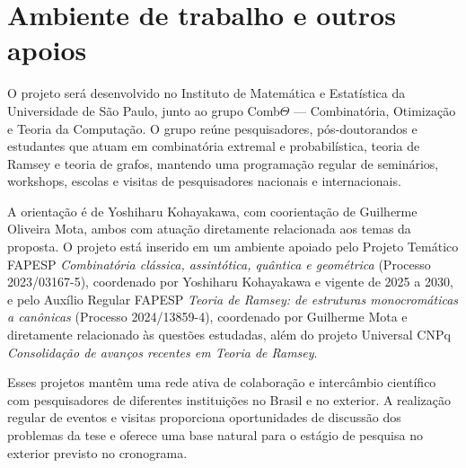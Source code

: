 \documentclass[11pt,a4paper]{article}
\theoremstyle{plain}
\theoremstyle{definition}
\begin{document}
\section{Ambiente de trabalho e outros apoios}


O projeto será desenvolvido no Instituto de Matemática e Estatística da
Universidade de São Paulo, junto ao grupo Comb$\Theta$ --- Combinatória,
Otimização e Teoria da Computação. O grupo reúne pesquisadores, pós-doutorandos
e estudantes que atuam em combinatória extremal e probabilística, teoria de
Ramsey e teoria de grafos, mantendo uma programação regular de seminários,
workshops, escolas e visitas de pesquisadores nacionais e internacionais.

A orientação é de Yoshiharu Kohayakawa, com coorientação de Guilherme Oliveira
Mota, ambos com atuação diretamente relacionada aos temas da proposta. O
projeto está inserido em um ambiente apoiado pelo Projeto Temático FAPESP
\emph{Combinatória clássica, assintótica, quântica e geométrica}
(Processo 2023/03167-5), coordenado por Yoshiharu Kohayakawa e vigente de
2025 a 2030, e pelo Auxílio Regular FAPESP
\emph{Teoria de Ramsey: de estruturas monocromáticas a canônicas}
(Processo 2024/13859-4), coordenado por Guilherme Mota e diretamente
relacionado às questões estudadas, além do projeto Universal CNPq
\emph{Consolidação de avanços recentes em Teoria de Ramsey}.

Esses projetos mantêm uma rede ativa de colaboração e intercâmbio científico
com pesquisadores de diferentes instituições no Brasil e no exterior. A
realização regular de eventos e visitas proporciona oportunidades de discussão
dos problemas da tese e oferece uma base natural para o estágio de pesquisa no
exterior previsto no cronograma.
\end{document}
